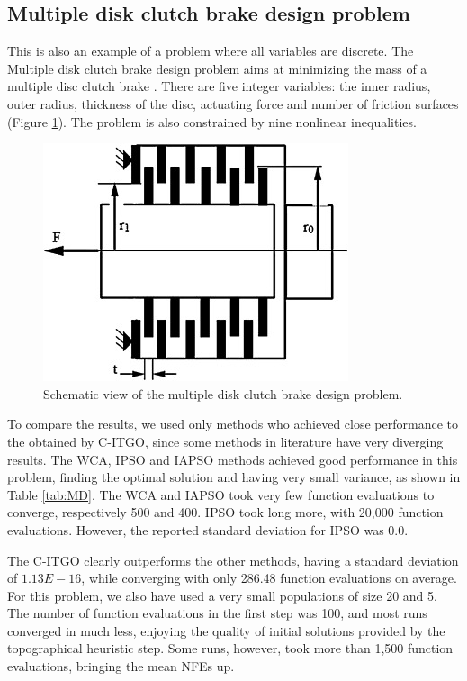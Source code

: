 \subsection{Multiple disk clutch brake design problem}

This is also an example of a problem where all variables are discrete. The Multiple disk clutch brake design problem aims at minimizing the mass of a multiple disc clutch brake \cite{MD}. There are five integer variables: the inner radius, outer radius, thickness of the disc, actuating force and number of friction surfaces (Figure \ref{fig:MD}). The problem is also constrained by nine nonlinear inequalities.

\begin{figure}[h]
\begin{center}
\includegraphics[scale=0.6]{Imgs/MD.jpg}
\end{center}
\captionsetup{justification=centering}
\caption{Schematic view of the multiple disk clutch brake design problem.}\label{fig:MD}
\end{figure}

To compare the results, we used only methods who achieved close performance to the obtained by C-ITGO, since some methods in literature have very diverging results. The WCA, IPSO and IAPSO methods achieved good performance in this problem, finding the optimal solution and having very small variance, as shown in Table \ref{tab:MD}. The WCA and IAPSO took very few function evaluations to converge, respectively 500 and 400. IPSO took long more, with 20,000 function evaluations. However, the reported standard deviation for IPSO was 0.0.



The C-ITGO clearly outperforms the other methods, having a standard deviation of $1.13E-16$, while converging with only 286.48 function evaluations on average. For this problem, we also have used a very small populations of size 20 and 5. The number of function evaluations in the first step was 100, and most runs converged in much less, enjoying the quality of initial solutions provided by the topographical heuristic step. Some runs, however, took more than 1,500 function evaluations, bringing the mean NFEs up.



